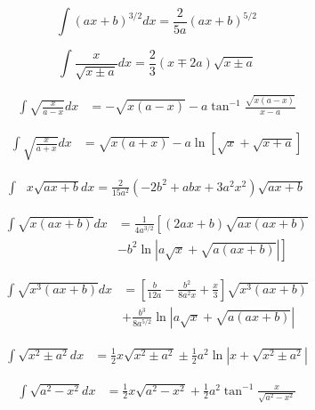 \documentclass[11pt, letterpaper, notitlepage]{article}
\begin{document}
\begin{multicols}{2}
\begin{footnotesize}
\begin{equation}
\int (ax+b)^{3/2}dx =\frac{2}{5a}(ax+b)^{5/2}
\end{equation}

\begin{equation}
\int \frac{x}{\sqrt{x\pm a} } dx = \frac{2}{3}(x\mp 2a)\sqrt{x\pm a}
\end{equation}

\begin{align}
\int \sqrt{\frac{x}{a-x}}dx &=  -\sqrt{x(a-x)}
-a\tan^{-1}\frac{\sqrt{x(a-x)}}{x-a}
\end{align}

\begin{align}
\int \sqrt{\frac{x}{a+x}}dx &=  \sqrt{x(a+x)} 
-a\ln \left [ \sqrt{x} + \sqrt{x+a}\right] 
\end{align}

\begin{align}
\int &x \sqrt{ax + b}dx =
\frac{2}{15 a^2}(-2b^2+abx + 3 a^2 x^2)
\sqrt{ax+b}
\end{align}

\begin{align}
\int \sqrt{x(ax+b)} dx &= \frac{1}{4a^{3/2}}\left[(2ax + b)\sqrt{ax(ax+b)} \right. \nonumber
\\& \left.
-b^2 \ln \left| a\sqrt{x} + \sqrt{a(ax+b)} \right| \right ] 
\end{align}

\begin{align}
\int \sqrt{x^3(ax+b)} dx &=\left [ 
\frac{b}{12a}-
\frac{b^2}{8a^2x}+
\frac{x}{3}\right] 
\sqrt{x^3(ax+b)} \nonumber \\& + 
\frac{b^3}{8a^{5/2}}\ln \left | a\sqrt{x} + \sqrt{a(ax+b)} \right |
\end{align}

\begin{align}
\int\sqrt{x^2 \pm a^2} dx &= \frac{1}{2}x\sqrt{x^2\pm a^2} 
\pm\frac{1}{2}a^2 \ln \left | x + \sqrt{x^2\pm a^2} \right | 
\end{align}

\begin{align}
\int  \sqrt{a^2 - x^2} dx &= \frac{1}{2} x \sqrt{a^2-x^2} 
+\frac{1}{2}a^2\tan^{-1}\frac{x}{\sqrt{a^2-x^2}}
\end{align}


\end{footnotesize}
\end{multicols}
\end{document}
